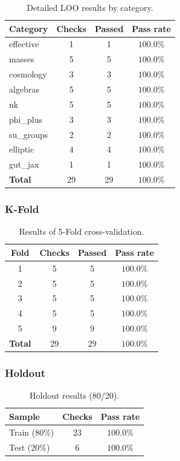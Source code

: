 \documentclass[11pt,a4paper]{article}
\theoremstyle{definition}
\begin{document}
\begin{table}[ht]
\centering
\caption{Detailed LOO results by category.}
\label{tab:loo-categories}
\begin{tabular}{lccc}
\toprule
Category & Checks & Passed & Pass rate \\
\midrule
effective    & 1  & 1  & $100.0\%$ \\
masses       & 5  & 5  & $100.0\%$ \\
cosmology    & 3  & 3  & $100.0\%$ \\
algebras     & 5  & 5  & $100.0\%$ \\
nk           & 5  & 5  & $100.0\%$ \\
phi\_plus    & 3  & 3  & $100.0\%$ \\
su\_groups   & 2  & 2  & $100.0\%$ \\
elliptic     & 4  & 4  & $100.0\%$ \\
gut\_jax     & 1  & 1  & $100.0\%$ \\
\midrule
\textbf{Total} & 29 & 29 & $\mathbf{100.0\%}$ \\
\bottomrule
\end{tabular}
\end{table}

\subsubsection{K-Fold}

\begin{table}[ht]
\centering
\caption{Results of 5-Fold cross-validation.}
\label{tab:kfold-main}
\begin{tabular}{cccc}
\toprule
Fold & Checks & Passed & Pass rate \\
\midrule
1 & 5 & 5 & $100.0\%$ \\
2 & 5 & 5 & $100.0\%$ \\
3 & 5 & 5 & $100.0\%$ \\
4 & 5 & 5 & $100.0\%$ \\
5 & 9 & 9 & $100.0\%$ \\
\midrule
\textbf{Total} & 29 & 29 & $\mathbf{100.0\%}$ \\
\bottomrule
\end{tabular}
\end{table}

\subsubsection{Holdout}

\begin{table}[ht]
\centering
\caption{Holdout results (80/20).}
\label{tab:holdout-main}
\begin{tabular}{lcc}
\toprule
Sample & Checks & Pass rate \\
\midrule
Train (80\%) & 23 & $100.0\%$ \\
Test (20\%)  & 6  & $100.0\%$ \\
\bottomrule
\end{tabular}
\end{table}
\end{document}
